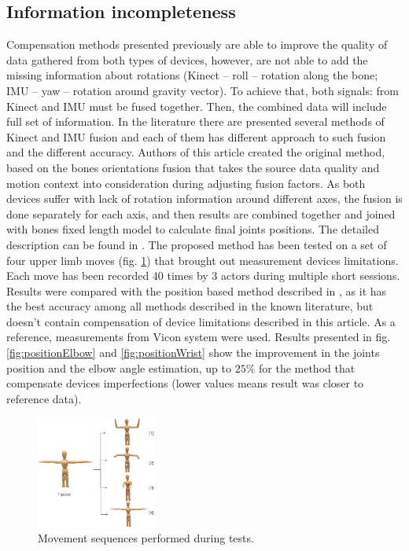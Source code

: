 \documentclass{llncs}
\begin{document}
\subsection{Information incompleteness}
Compensation methods presented previously are able to improve the quality of data gathered from both types of devices, however, are not able to add the missing information about rotations (Kinect -- roll -- rotation along the bone; IMU -- yaw -- rotation around gravity vector). To achieve that, both signals: from Kinect and IMU must be fused together. Then, the combined data will include full set of information. In the literature there are presented several methods of Kinect and IMU fusion \cite{Tian2015,Bo2011,Kalkbrenner2014} and each of them has different approach to such fusion and the different accuracy. Authors of this article created the original method, based on the bones orientations fusion that takes the source data quality and motion context into consideration during adjusting fusion factors. As both devices suffer with lack of rotation information around different axes, the fusion is done separately for each axis, and then results are combined together and joined with bones fixed length model to calculate final joints positions. The detailed description can be found in \cite{Glonek2016}. The proposed method has been tested on a set of four upper limb moves (fig. \ref{fig:poses}) that brought out measurement devices limitations. Each move has been recorded 40 times by 3 actors during multiple short sessions. Results were compared with the position based method described in \cite{Kalkbrenner2014}, as it has the best accuracy among all methods described in the known literature, but doesn't contain compensation of device limitations described in this article. As a reference, measurements from Vicon system were used. Results presented in fig. \ref{fig:positionElbow} and \ref{fig:positionWrist} show the improvement in the joints position and the elbow angle estimation, up to $25\%$ for the method that compensate devices imperfections (lower values means result was closer to reference data). 

\begin{figure}[h!]
	\centering
	\includegraphics[width=0.35\textwidth]{images/Fig12.eps}
	\caption{Movement sequences performed during tests.}
	\label{fig:poses}
\end{figure}
\end{document}
